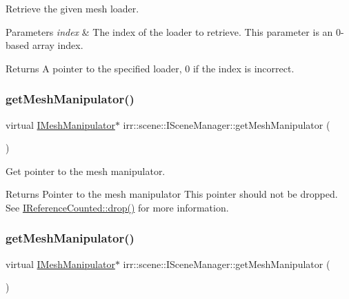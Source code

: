 Retrieve the given mesh loader. 


\begin{DoxyParams}{Parameters}
{\em index} & The index of the loader to retrieve. This parameter is an 0-\/based array index. \\
\hline
\end{DoxyParams}
\begin{DoxyReturn}{Returns}
A pointer to the specified loader, 0 if the index is incorrect. 
\end{DoxyReturn}
\mbox{\label{classirr_1_1scene_1_1ISceneManager_a05138d6b5f99fced0061794fb5c42318}} 
\subsubsection{\texorpdfstring{get\+Mesh\+Manipulator()}{getMeshManipulator()}\hspace{0.1cm}{\footnotesize\ttfamily [1/2]}}
{\footnotesize\ttfamily virtual \hyperlink{classirr_1_1scene_1_1IMeshManipulator}{I\+Mesh\+Manipulator}$\ast$ irr\+::scene\+::\+I\+Scene\+Manager\+::get\+Mesh\+Manipulator (\begin{DoxyParamCaption}{ }\end{DoxyParamCaption})\hspace{0.3cm}{\ttfamily [pure virtual]}}



Get pointer to the mesh manipulator. 

\begin{DoxyReturn}{Returns}
Pointer to the mesh manipulator This pointer should not be dropped. See \hyperlink{classirr_1_1IReferenceCounted_a03856a09355b89d178090c4a5f738543}{I\+Reference\+Counted\+::drop()} for more information. 
\end{DoxyReturn}
\mbox{\label{classirr_1_1scene_1_1ISceneManager_a05138d6b5f99fced0061794fb5c42318}} 
\subsubsection{\texorpdfstring{get\+Mesh\+Manipulator()}{getMeshManipulator()}\hspace{0.1cm}{\footnotesize\ttfamily [2/2]}}
{\footnotesize\ttfamily virtual \hyperlink{classirr_1_1scene_1_1IMeshManipulator}{I\+Mesh\+Manipulator}$\ast$ irr\+::scene\+::\+I\+Scene\+Manager\+::get\+Mesh\+Manipulator (\begin{DoxyParamCaption}{ }\end{DoxyParamCaption})\hspace{0.3cm}{\ttfamily [pure virtual]}}



